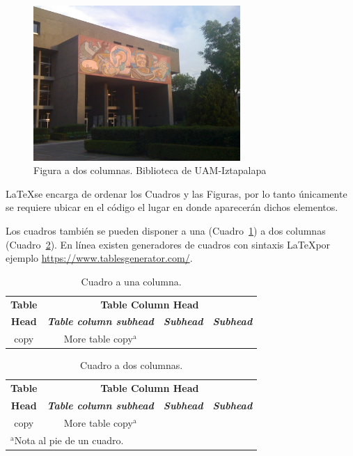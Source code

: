 \documentclass[conference]{IEEEtran}
\begin{document}
\begin{figure}[htbp]
\centering
\includegraphics[width=0.7\textwidth]{fig2}
\caption{Figura a dos columnas. Biblioteca de UAM-Iztapalapa}
\label{fig:2}
\end{figure}

\LaTeX se encarga de ordenar los Cuadros y las Figuras, por lo tanto únicamente se requiere ubicar en el código el lugar en donde aparecerán dichos elementos.

Los cuadros también se pueden disponer a una (Cuadro~\ref{tab:1}) a dos columnas (Cuadro~\ref{tab:2}). En línea existen generadores de cuadros con sintaxis \LaTeX por ejemplo \url{https://www.tablesgenerator.com/}.

\begin{table}[htbp]
\caption{Cuadro a una columna.}
\begin{center}
\begin{tabular}{|c|c|c|c|}
\hline
\textbf{Table}&\multicolumn{3}{|c|}{\textbf{Table Column Head}} \\
\cline{2-4} 
\textbf{Head} & \textbf{\textit{Table column subhead}}& \textbf{\textit{Subhead}}& \textbf{\textit{Subhead}} \\
\hline
copy& More table copy$^{\mathrm{a}}$& &  \\
\hline
\end{tabular}
\label{tab:1}
\end{center}
\end{table}

\begin{table}[htbp]
\caption{Cuadro a dos columnas.}
\begin{center}
\begin{tabular}{|c|c|c|c|}
\hline
\textbf{Table}&\multicolumn{3}{|c|}{\textbf{Table Column Head}} \\
\cline{2-4} 
\textbf{Head} & \textbf{\textit{Table column subhead}}& \textbf{\textit{Subhead}}& \textbf{\textit{Subhead}} \\
\hline
copy& More table copy$^{\mathrm{a}}$& &  \\
\hline
\multicolumn{4}{l}{$^{\mathrm{a}}$Nota al pie de un cuadro.}
\end{tabular}
\label{tab:2}
\end{center}
\end{table}
\end{document}
